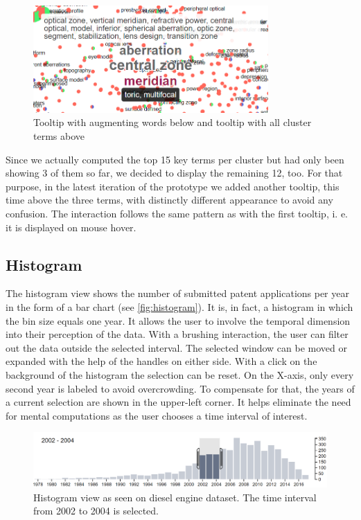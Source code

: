 \begin{figure}[!]
\centering
\includegraphics[width=0.8\textwidth]{img/tooltips}
\caption{Tooltip with augmenting words below and tooltip with all cluster terms above}
\label{fig:tooltips}
\end{figure}

Since we actually computed the top 15 key terms per cluster but had only been showing 3 of them so far, we decided to display the remaining 12, too.  
For that purpose, in the latest iteration of the prototype we added another tooltip, this time above the three terms, with distinctly different appearance to avoid any confusion.
The interaction follows the same pattern as with the first tooltip, i. e. it is displayed on mouse hover.

\subsection{Histogram}
\label{subsec:histogram}

The histogram view shows the number of submitted patent applications per year in the form of a bar chart (see \autoref{fig:histogram}).
It is, in fact, a histogram in which the bin size equals one year.
It allows the user to involve the temporal dimension into their perception of the data.
With a brushing interaction, the user can filter out the data outside the selected interval.
The selected window can be moved or expanded with the help of the handles on either side.
With a click on the background of the histogram the selection can be reset.
On the X-axis, only every second year is labeled to avoid overcrowding.
To compensate for that, the years of a current selection are shown in the upper-left corner.
It helps eliminate the need for mental computations as the user chooses a time interval of interest.

\begin{figure}[!]
\centering
\includegraphics[width=\textwidth]{img/histogram}
\caption{Histogram view as seen on diesel engine dataset. The time interval from 2002 to 2004 is selected.}
\label{fig:histogram}
\end{figure}

